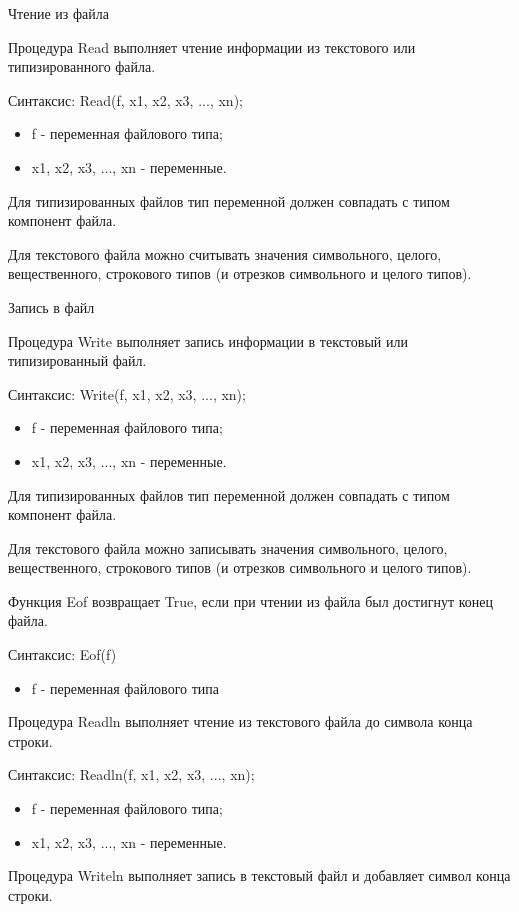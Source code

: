 \documentclass{beamer}
\begin{document}
\begin{frame}[fragile]{Чтение из файла}
\begin{block}{Процедура Read}
выполняет чтение информации из текстового или типизированного файла.
\end{block}
Синтаксис: Read(f, x1, x2, x3, $...$, xn);
\begin{itemize}
\item f - переменная файлового типа;
\item x1, x2, x3, $...$, xn - переменные.
\end{itemize}
Для типизированных файлов тип переменной должен совпадать с типом компонент файла.

Для текстового файла можно считывать значения символьного, целого, вещественного, строкового типов (и отрезков символьного и целого типов).
\end{frame} 

\begin{frame}[fragile]{Запись в файл}
\begin{block}{Процедура Write}
выполняет запись информации в текстовый или типизированный файл.
\end{block}
Синтаксис: Write(f, x1, x2, x3, $...$, xn);
\begin{itemize}
\item f - переменная файлового типа;
\item x1, x2, x3, $...$, xn - переменные.
\end{itemize}
Для типизированных файлов тип переменной должен совпадать с типом компонент файла.

Для текстового файла можно записывать значения символьного, целого, вещественного, строкового типов (и отрезков символьного и целого типов).
\end{frame} 

\begin{frame}[fragile]
\begin{block}{Функция Eof}
возвращает True, если при чтении из файла был достигнут конец файла.
\end{block}
Синтаксис: Eof(f)
\begin{itemize}
\item f - переменная файлового типа
\end{itemize}
\begin{block}{Процедура Readln}
выполняет чтение из текстового файла до символа конца строки.
\end{block}
Синтаксис: Readln(f, x1, x2, x3, $...$, xn);
\begin{itemize}
\item f - переменная файлового типа;
\item x1, x2, x3, $...$, xn - переменные.
\end{itemize}
\begin{block}{Процедура Writeln}
выполняет запись в текстовый файл и добавляет символ конца строки.
\end{block}
\end{frame}
\end{document}
